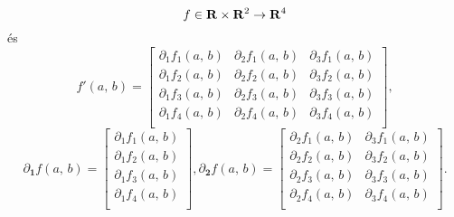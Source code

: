\[
	f \in \mathbf{R} \times \mathbf{R}^2 \to \mathbf{R}^4
\]
és 
\[
	f'(a, \, b) = \begin{bmatrix}
		\partial_1f_1(a, \, b) & \partial_2f_1(a, \, b) & \partial_3f_1(a, \, b) \\
		\partial_1f_2(a, \, b) & \partial_2f_2(a, \, b) & \partial_3f_2(a, \, b) \\
		\partial_1f_3(a, \, b) & \partial_2f_3(a, \, b) & \partial_3f_3(a, \, b) \\
		\partial_1f_4(a, \, b) & \partial_2f_4(a, \, b) & 	\partial_3f_4(a, \, b) \\
	\end{bmatrix},
\]
\[
	\partial_{\mathbf{1}}f(a, \, b) = \begin{bmatrix}
		\partial_1f_1(a, \, b) \\
		\partial_1f_2(a, \, b) \\
		\partial_1f_3(a, \, b) \\
		\partial_1f_4(a, \, b) \\
	\end{bmatrix},
	\partial_{\mathbf{2}}f(a, \, b) = \begin{bmatrix}
		\partial_2f_1(a, \, b) & \partial_3f_1(a, \, b) \\
		\partial_2f_2(a, \, b) & \partial_3f_2(a, \, b) \\
		\partial_2f_3(a, \, b) & \partial_3f_3(a, \, b) \\
		\partial_2f_4(a, \, b) & \partial_3f_4(a, \, b) \\
	\end{bmatrix}.
\]